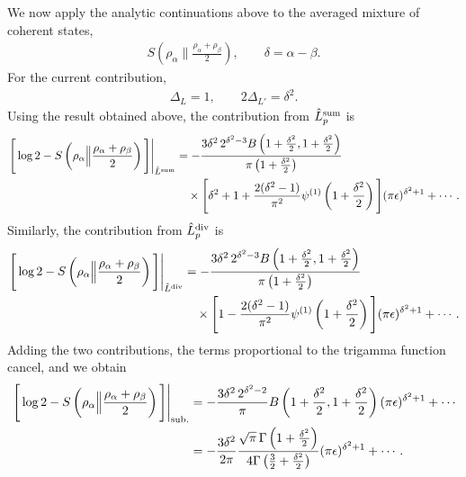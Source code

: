 \documentclass[11pt]{article}
\newcommand{\ep}{\epsilon}
\newcommand{\nn}{\nonumber}
\newcommand{\lb}{\left(}
\newcommand{\rb}{\right)}
\begin{document}
We now apply the analytic continuations above to the averaged mixture of coherent states,
\begin{align}
    S\lb
    \rho_\alpha
    \Big\|
    \frac{\rho_\alpha+\rho_\beta}{2}
    \rb,
    \qquad
    \delta=\alpha-\beta .
\end{align}
For the current contribution,
\begin{align}
    \Delta_L=1,
    \qquad
    2\Delta_{L'}=\delta^2.
\end{align}
Using the result obtained above, the contribution from $\hat L_p^{\rm sum}$ is
\begin{align}
    \left.
    \Bigg[
    \log 2-
    S\lb
    \rho_\alpha
    \Big\|
    \frac{\rho_\alpha+\rho_\beta}{2}
    \rb
    \Bigg]
    \right|_{\hat L^{\rm sum}}
    &=
    -\frac{
    3\delta^2\,2^{\delta^2-3}
    B\lb
    1+\frac{\delta^2}{2},
    1+\frac{\delta^2}{2}
    \rb
    }{
    \pi\lb1+\frac{\delta^2}{2}\rb
    }
    \nn\\
    &\quad\times
    \Bigg[
    \delta^2+1
    +
    \frac{2(\delta^2-1)}{\pi^2}
    \psi^{(1)}
    \lb1+\frac{\delta^2}{2}\rb
    \Bigg]
    (\pi\ep)^{\delta^2+1}
    +\cdots .
\end{align}
Similarly, the contribution from $\hat L_p^{\rm div}$ is
\begin{align}
    \left.
    \Bigg[
    \log 2-
    S\lb
    \rho_\alpha
    \Big\|
    \frac{\rho_\alpha+\rho_\beta}{2}
    \rb
    \Bigg]
    \right|_{\hat L^{\rm div}}
    &=
    -\frac{
    3\delta^2\,2^{\delta^2-3}
    B\lb
    1+\frac{\delta^2}{2},
    1+\frac{\delta^2}{2}
    \rb
    }{
    \pi\lb1+\frac{\delta^2}{2}\rb
    }
    \nn\\
    &\quad\times
    \Bigg[
    1
    -
    \frac{2(\delta^2-1)}{\pi^2}
    \psi^{(1)}
    \lb1+\frac{\delta^2}{2}\rb
    \Bigg]
    (\pi\ep)^{\delta^2+1}
    +\cdots .
\end{align}
Adding the two contributions, the terms proportional to the trigamma function cancel, and we obtain
\begin{align}
    \left.
    \Bigg[
    \log 2-
    S\lb
    \rho_\alpha
    \Big\|
    \frac{\rho_\alpha+\rho_\beta}{2}
    \rb
    \Bigg]
    \right|_{\rm sub.}
    &=
    -\frac{
    3\delta^2\,2^{\delta^2-2}
    }{\pi}
    B\lb
    1+\frac{\delta^2}{2},
    1+\frac{\delta^2}{2}
    \rb
    (\pi\ep)^{\delta^2+1}
    +\cdots
    \nn\\
    &=
    -\frac{3\delta^2}{2\pi}
    \frac{
    \sqrt{\pi}\,
    \Gamma\lb1+\frac{\delta^2}{2}\rb
    }{
    4\Gamma\lb\frac32+\frac{\delta^2}{2}\rb
    }
    (\pi\ep)^{\delta^2+1}
    +\cdots .
\end{align}
\end{document}
